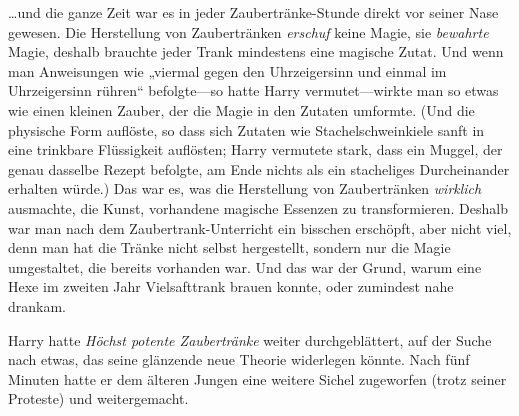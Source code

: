 …und die ganze Zeit war es in jeder Zaubertränke-Stunde direkt vor seiner Nase gewesen. Die Herstellung von Zaubertränken \emph{erschuf} keine Magie, sie \emph{bewahrte} Magie, deshalb brauchte jeder Trank mindestens eine magische Zutat. Und wenn man Anweisungen wie „viermal gegen den Uhrzeigersinn und einmal im Uhrzeigersinn rühren“ befolgte—so hatte Harry vermutet—wirkte man so etwas wie einen kleinen Zauber, der die Magie in den Zutaten umformte. (Und die physische Form auflöste, so dass sich Zutaten wie Stachelschweinkiele sanft in eine trinkbare Flüssigkeit auflösten; Harry vermutete stark, dass ein Muggel, der genau dasselbe Rezept befolgte, am Ende nichts als ein stacheliges Durcheinander erhalten würde.) Das war es, was die Herstellung von Zaubertränken \emph{wirklich} ausmachte, die Kunst, vorhandene magische Essenzen zu transformieren. Deshalb war man nach dem Zaubertrank-Unterricht ein bisschen erschöpft, aber nicht viel, denn man hat die Tränke nicht selbst hergestellt, sondern nur die Magie umgestaltet, die bereits vorhanden war. Und das war der Grund, warum eine Hexe im zweiten Jahr Vielsafttrank brauen konnte, oder zumindest nahe drankam.

Harry hatte \emph{Höchst potente Zaubertränke} weiter durchgeblättert, auf der Suche nach etwas, das seine glänzende neue Theorie widerlegen könnte. Nach fünf Minuten hatte er dem älteren Jungen eine weitere Sichel zugeworfen (trotz seiner Proteste) und weitergemacht.

